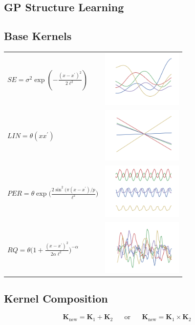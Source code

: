 \documentclass[a0,portrait]{a0poster}
\begin{document}
\begin{multicols}{3}
\section*{GP Structure Learning}

\subsection*{Base Kernels}
 \begin{center} 
\begin{tabular}{m{11.5cm} m{4cm}}
$SE = \sigma^2 \exp(-\frac{(x-x^\prime)^2}{2\ell^2})$&\includegraphics[width=4cm]{gpSamples/se.png}\\
$LIN = \theta (x x^\prime)$&\includegraphics[width=4cm]{gpSamples/lin.png}\\
$PER = \theta \exp \bigg( \frac{2 \sin^2 ( \pi (x - x^\prime)/p}{\ell^2} \bigg)$&\includegraphics[width=4cm]{gpSamples/per.png}\\
$RQ =   \theta \bigg(1 + \frac{(x - x^\prime)^2}{2 \alpha \ell^2} \bigg)^{-\alpha}$&\includegraphics[width=4cm]{gpSamples/rq.png}
\end{tabular}
\end{center}
\subsection*{Kernel Composition}
\begin{equation*}
\mathbf{K}_{\textrm{new}} = \mathbf{K}_1 + \mathbf{K}_2 \;\;\;\;\;\;\text{or}\;\;\;\;\;\; \mathbf{K}_{\textrm{new}} = \mathbf{K}_1 \times \mathbf{K}_2 
\end{equation*}


\end{multicols}
\end{document}
